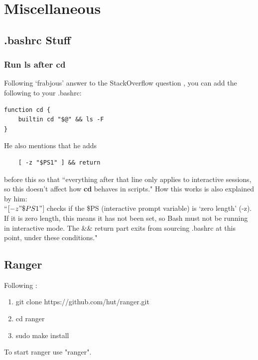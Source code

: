 \chapter{Miscellaneous} \label{ChapMisc}

\section{.bashrc Stuff}
\subsection{Run \textbf{ls} after \textbf{cd}}
Following `frabjous' answer to the StackOverflow question
\cite{robkohr2011make}, you can add the following to your .bashrc:
\begin{lstlisting}
function cd {
    builtin cd "$@" && ls -F
}
\end{lstlisting}
He also mentions that he adds
\begin{lstlisting}
    [ -z "$PS1" ] && return
\end{lstlisting}
before this so that ``everything after that line only applies to interactive
sessions, so this doesn't affect how \textbf{cd} behaves in scripts." How this
works is also explained by him:\\
``$[ -z "\$PS1" $] checks if the \$PS (interactive prompt variable) is `zero
length' (-z). If it is zero length, this means it has not been set, so Bash must
not be running in interactive mode. The \&\& return part exits from sourcing
.bashrc at this point, under these conditions."

\section{Ranger}
Following \cite{linuxcompendium2019ranger}:
\begin{enumerate}
    \item git clone https://github.com/hut/ranger.git
    \item cd ranger
    \item sudo make install
\end{enumerate}
To start ranger use "ranger".

